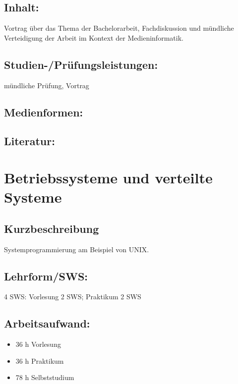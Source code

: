 \section{Inhalt:}\label{inhalt-4}

Vortrag über das Thema der Bachelorarbeit, Fachdiskussion und mündliche
Verteidigung der Arbeit im Kontext der Medieninformatik.

\section{Studien-/Prüfungsleistungen:}\label{studien-pruxfcfungsleistungen-4}

mündliche Prüfung, Vortrag

\section{Medienformen:}\label{medienformen-4}

\section{Literatur:}\label{literatur-4}

\chapter{Betriebssysteme und verteilte
Systeme}\label{betriebssysteme-und-verteilte-systeme}

\section{Kurzbeschreibung}\label{kurzbeschreibung-1}

Systemprogrammierung am Beispiel von UNIX.

\section{Lehrform/SWS:}\label{lehrformsws-5}

4 SWS: Vorlesung 2 SWS; Praktikum 2 SWS

\section{Arbeitsaufwand:}\label{arbeitsaufwand-5}

\begin{itemize}
\tightlist
\item
  36 h Vorlesung
\item
  36 h Praktikum
\item
  78 h Selbststudium
\end{itemize}

